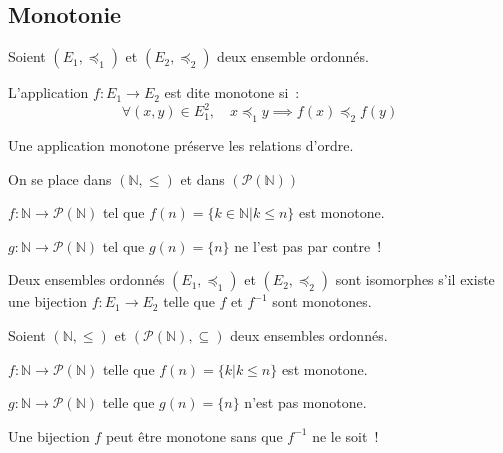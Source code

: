 \documentclass[a4paper, titlepage]{article}
\begin{document}
    \subsection{Monotonie}
    \begin{defn}
        Soient $(E_1,\preceq_1)$ et $(E_2,\preceq_2)$ deux ensemble ordonnés.

        L'application $f:E_1\to E_2$ est dite monotone si~:
        $$ \forall (x,y)\in E_1^2,\quad x\preceq_1 y \implies f(x)\preceq_2 f(y) $$
    \end{defn}
    Une application monotone préserve les relations d'ordre.
    \begin{exemple}
        On se place dans $(\mathbb{N},\leqslant)$ et dans $(\mathcal{P}(\mathbb{N}))$

        $f:\mathbb{N}\to \mathcal{P}(\mathbb{N})$ tel que $f(n) = \{k\in\mathbb{N}|k\leqslant n\}$ est monotone.

        $g:\mathbb{N}\to \mathcal{P}(\mathbb{N})$ tel que $g(n)=\{n\}$ ne l'est pas par contre~!
    \end{exemple}
    \begin{props}
        Deux ensembles ordonnés $(E_1,\preceq_1)$ et $(E_2,\preceq_2)$ sont isomorphes s'il existe une bijection
        $f:E_1\to E_2$ telle que $f$ et $f^{-1}$ sont monotones.
    \end{props}
    \begin{exemple}
        Soient $(\mathbb{N},\leqslant)$ et $(\mathcal{P}(\mathbb{N}),\subseteq)$ deux ensembles ordonnés.

        $f:\mathbb{N}\to\mathcal{P}(\mathbb{N})$ telle que $f(n) = \{k|k\leqslant n\}$ est monotone.

        $g:\mathbb{N}\to\mathcal{P}(\mathbb{N})$ telle que $g(n) = \{ n\}$ n'est pas monotone.
    \end{exemple}
    \begin{warn}
        Une bijection $f$ peut être monotone sans que $f^{-1}$ ne le soit~!
    \end{warn}
\end{document}
